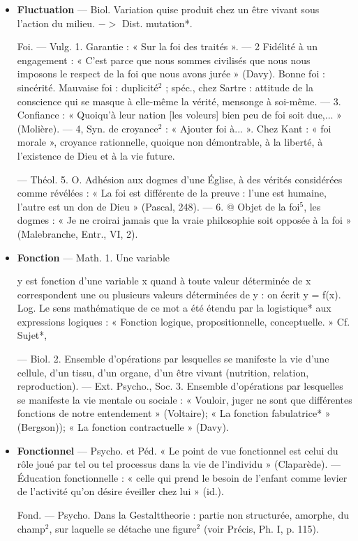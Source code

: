 \begin{itemize}[leftmargin=1cm, label=, itemsep=1pt]
\item {\bf Fluctuation} — Biol. Variation quise produit chez un être vivant sous l’action
du milieu. $->$ Dist. mutation*.

Foi. — Vulg. 1. Garantie : « Sur la
foi des traités ». — 2 Fidélité à un
engagement : « C’est parce que nous
sommes civilisés que nous nous
imposons le respect de la foi que
nous avons jurée » (Davy). Bonne
foi : sincérité. Mauvaise foi : duplicité$^2$ ; spéc., chez Sartre : attitude de
la conscience qui se masque à elle-même la vérité, mensonge à soi-même. — 3. Confiance : « Quoiqu’à leur nation [les voleurs] bien
peu de foi soit due,... » (Molière).
— 4, Syn. de croyance$^2$ : « Ajouter
foi à... ». Chez Kant : « foi morale »,
croyance rationnelle, quoique non
démontrable, à la liberté, à l’existence de Dieu et à la vie future.

— Théol. 5. O. Adhésion aux
dogmes d’une Église, à des vérités
considérées comme révélées : « La
foi est différente de la preuve : l’une
est humaine, l’autre est un don de
Dieu » (Pascal, 248). — 6. @ Objet
de la foi$^5$, les dogmes : « Je ne croirai
jamais que la vraie philosophie soit
opposée à la foi » (Malebranche,
Entr., VI, 2).

\item {\bf Fonction} — Math. 1. Une variable

y est fonction d’une variable x quand
à toute valeur déterminée de x correspondent une ou plusieurs valeurs
déterminées de y : on écrit y = f(x).
Log. Le sens mathématique de ce
mot a été étendu par la logistique*
aux expressions logiques : « Fonction logique, propositionnelle, conceptuelle. » Cf. Sujet*,

— Biol. 2. Ensemble d'opérations
par lesquelles se manifeste la vie
d'une cellule, d'un tissu, d’un organe, d’un être vivant (nutrition,
relation, reproduction). — Ext.
Psycho., Soc. 3. Ensemble d’opérations par lesquelles se manifeste la
vie mentale ou sociale : « Vouloir,
juger ne sont que différentes fonctions de notre entendement » (Voltaire); « La fonction fabulatrice* »
(Bergson)); « La fonction contractuelle » (Davy).

\item {\bf Fonctionnel} — Psycho. et Péd. « Le
point de vue fonctionnel est celui
du rôle joué par tel ou tel processus
dans la vie de l'individu » (Claparède). — Éducation fonctionnelle :
« celle qui prend le besoin de l'enfant
comme levier de l’activité qu'on
désire éveiller chez lui » (id.).

Fond. — Psycho. Dans la Gestalttheorie : partie non structurée,
amorphe, du champ$^2$, sur laquelle
se détache une figure$^2$ (voir Précis,
Ph. I, p. 115).


\end{itemize}
